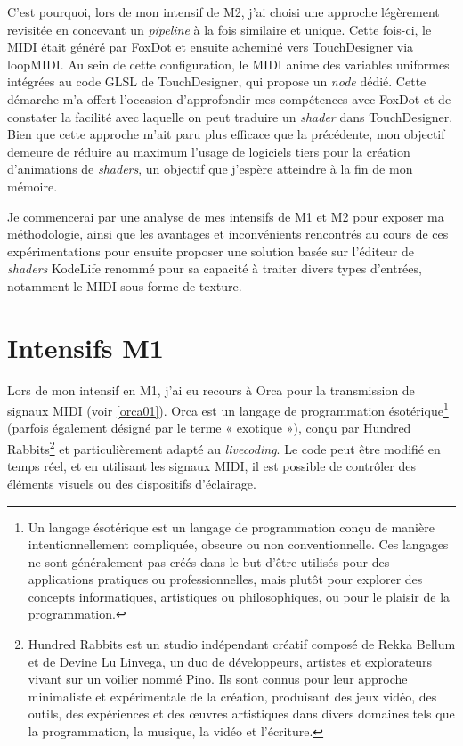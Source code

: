 C'est pourquoi, lors de mon intensif de M2, j'ai choisi une approche légèrement revisitée en concevant un \textit{pipeline} à la fois similaire et unique. Cette fois-ci, le MIDI était généré par FoxDot et ensuite acheminé vers TouchDesigner via loopMIDI. Au sein de cette configuration, le MIDI anime des variables uniformes intégrées au code GLSL de TouchDesigner, qui propose un \textit{node} dédié. Cette démarche m'a offert l'occasion d'approfondir mes compétences avec FoxDot et de constater la facilité avec laquelle on peut traduire un \textit{shader} dans TouchDesigner. Bien que cette approche m'ait paru plus efficace que la précédente, mon objectif demeure de réduire au maximum l'usage de logiciels tiers pour la création d'animations de \textit{shaders}, un objectif que j'espère atteindre à la fin de mon mémoire.

Je commencerai par une analyse de mes intensifs de M1 et M2 pour exposer ma méthodologie, ainsi que les avantages et inconvénients rencontrés au cours de ces expérimentations pour ensuite proposer une solution basée sur l'éditeur de \textit{shaders} KodeLife renommé pour sa capacité à traiter divers types d'entrées, notamment le MIDI sous forme de texture.


\newpage
\section{Intensifs M1}

Lors de mon intensif en M1, j'ai eu recours à Orca pour la transmission de signaux MIDI (voir \ref{orca01}). Orca est un langage de programmation ésotérique\footnote{Un langage ésotérique est un langage de programmation conçu de manière intentionnellement compliquée, obscure ou non conventionnelle. Ces langages ne sont généralement pas créés dans le but d'être utilisés pour des applications pratiques ou professionnelles, mais plutôt pour explorer des concepts informatiques, artistiques ou philosophiques, ou pour le plaisir de la programmation.} (parfois également désigné par le terme « exotique »), conçu par Hundred Rabbits\footnote{Hundred Rabbits est un studio indépendant créatif composé de Rekka Bellum et de Devine Lu Linvega, un duo de développeurs, artistes et explorateurs vivant sur un voilier nommé Pino. Ils sont connus pour leur approche minimaliste et expérimentale de la création, produisant des jeux vidéo, des outils, des expériences et des œuvres artistiques dans divers domaines tels que la programmation, la musique, la vidéo et l'écriture.} et particulièrement adapté au \textit{livecoding}. Le code peut être modifié en temps réel, et en utilisant les signaux MIDI, il est possible de contrôler des éléments visuels ou des dispositifs d'éclairage.

